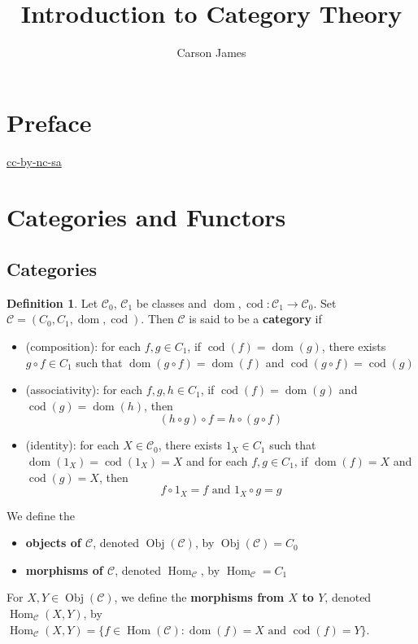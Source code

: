 \documentclass[12pt]{amsart}
\theoremstyle{definition}
\newtheorem{defn}[definition]{Definition}
\newcommand{\MC}{\mathcal{C}}
\DeclareMathOperator{\dom}{dom}
\DeclareMathOperator{\cod}{cod}
\DeclareMathOperator{\Obj}{Obj}
\DeclareMathOperator{\Hom}{Hom}
\begin{document}
	
	\title{Introduction to Category Theory}
	\author{Carson James}
	\maketitle
	
	\tableofcontents
	
	\section*{Preface}
	\begin{flushleft}
		\href{https://creativecommons.org/licenses/by-nc-sa/4.0/legalcode.txt}{cc-by-nc-sa}
	\end{flushleft}
	
	
	
	\newpage
	
	
	\newpage
	
	\section{Categories and Functors}
	
	\subsection{Categories}
	
	
	\begin{defn}
		Let $\MC_0$, $\MC_1$ be classes and $\dom, \cod : \MC_1 \rightarrow \MC_0$. Set $\MC = (C_0, C_1, \dom, \cod)$. Then $\MC$ is said to be a \textbf{category} if 
		\begin{itemize}
			\item (composition): for each $f,g \in C_1$, if $\cod(f) = \dom(g)$, there exists $g \circ f \in C_1$ such that $\dom(g \circ f) = \dom(f)$ and $\cod(g \circ f) = \cod(g)$
			\item (associativity): for each $f,g,h \in C_1$, if $\cod(f) = \dom(g)$ and $\cod(g) = \dom(h)$, then $$(h \circ g) \circ f = h \circ (g \circ f)$$  
			\item (identity): for each $X \in \MC_0$, there exists $1_{X} \in C_1$ such that $\dom(1_X) = \cod(1_X) = X$ and for each $f, g \in C_1$, if $\dom(f) = X$ and $\cod(g) = X$, then $$f \circ 1_X = f \text{ and } 1_X \circ g = g$$ 
		\end{itemize}
		We define the
		\begin{itemize}
			\item \textbf{objects of $\MC$}, denoted $\Obj(\MC)$, by $\Obj(\MC) = C_0$
			\item \textbf{morphisms of $\MC$}, denoted $\Hom_{\MC}$, by $\Hom_{\MC} = C_1$
		\end{itemize}
		For $X, Y \in \Obj(\MC)$, we define the \textbf{morphisms from $X$ to $Y$}, denoted $\Hom_{\MC}(X, Y)$, by $\Hom_{\MC}(X, Y) = \{f \in \Hom(\MC): \dom(f) = X \text{ and } \cod(f) = Y\}$.
	\end{defn}
\end{document}
